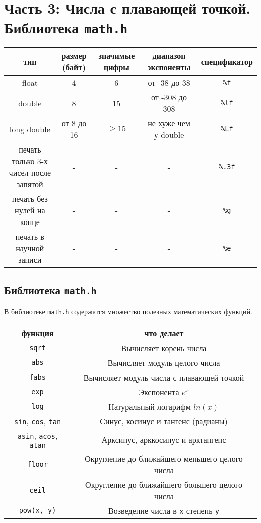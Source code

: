 \documentclass{article}
\begin{document}
\newpage
\section*{Часть 3: Числа с плавающей точкой. Библиотека \texttt{math.h}}
\begin{center}
\begin{tabular}{ c c c c c }
 тип & размер (байт) & значимые цифры & диапазон экспоненты & спецификатор \\ \hline
 float             & 4          & 6  & от -38 до 38    & \texttt{\%f} \\ 
 double            & 8          & 15 & от -308 до 308  & \texttt{\%lf}  \\  
 long double       & от 8 до 16 & $\ge 15$  & не хуже чем у double  & \texttt{\%Lf}  \\ \hline
 печать только 3-х чисел после запятой & -          & -  & -              & \texttt{\%.3f} \\
 печать без нулей на конце & -          & -  & -              & \texttt{\%g} \\
 печать в научной записи   & -          & -  & -              & \texttt{\%e} \\
\end{tabular}
\end{center}


\subsection*{Библиотека \texttt{math.h}}
В библиотеке \texttt{math.h} содержатся множество полезных математических функций.

\begin{center}
\begin{tabular}{ c c }
 функция & что делает \\ \hline
 \texttt{sqrt}     & Вычисляет корень числа \\ 
 \texttt{abs}      & Вычисляет модуль целого числа \\ 
 \texttt{fabs}     & Вычисляет модуль числа с плавающей точкой \\ 
 \texttt{exp}      & Экспонента $e^x$ \\ 
 \texttt{log}      & Натуральный логарифм $ln(x)$ \\
 \texttt{sin}, \texttt{cos},  \texttt{tan} & Синус, косинус и тангенс (радианы) \\ 
 \texttt{asin}, \texttt{acos},  \texttt{atan} & Арксинус, арккосинус и арктангенс \\ 
 \texttt{floor}      & Округление до ближайшего меньшего целого числа \\
 \texttt{ceil}       & Округление до ближайшего большего целого числа \\
 \texttt{pow(x, y)}        & Возведение числа в \texttt{x} степень \texttt{y} \\
\end{tabular}
\end{center}
\end{document}
